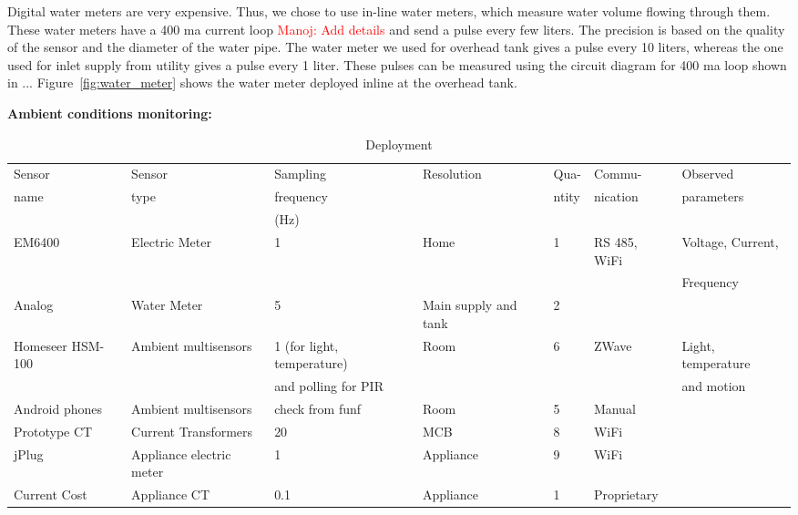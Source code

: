 \documentclass[10pt]{sensys-proc}
\newcommand{\redcolor}[1]{\textcolor{red}{#1}}
\newcommand{\figref}[1]{Figure~\ref{#1}}
\begin{document}
\noindent Digital water meters are very expensive. Thus, we chose to use in-line water meters, which measure water volume flowing through them. These water meters have a 400 ma current loop \redcolor{Manoj: Add details} and send a pulse every few liters. The precision is based on the quality of the sensor and the diameter of the water pipe. The water meter we used for overhead tank gives a pulse every 10 liters, whereas the one used for inlet supply from utility gives a pulse every 1 liter. These pulses can be measured using the circuit diagram for 400 ma loop shown in ... \figref{fig:water_meter} shows the water meter deployed inline at the overhead tank.

\noindent \textbf{Ambient conditions monitoring:} 




\begin{table}
\caption{Deployment}

\label{tab:sensing}
\tabcolsep=0.015cm
\begin{tabular}{|l|l|l|l|l|l|l|}
\hline
Sensor&Sensor&Sampling&Resolution&Qua-&Commu-&Observed\\
name&type&frequency&&ntity&nication&parameters\\
&&(Hz)&&&&\\
\hline

EM6400&Electric Meter&1&Home&1&RS 485, WiFi&Voltage, Current,\\ 
&&&&&&Frequency\\ \hline
Analog&Water Meter&5&Main supply and tank&2&\\ \hline
Homeseer HSM-100&Ambient multisensors&1 (for light, temperature)&Room &6&ZWave&Light, temperature\\ 
                &&and polling for PIR&&&& and motion\\ \hline
Android phones&Ambient multisensors& check from funf&Room&5&Manual\\ \hline
Prototype CT&Current Transformers&20&MCB&8&WiFi\\ \hline
jPlug&Appliance electric meter & 1 &Appliance&9&WiFi\\ \hline
Current Cost&Appliance CT&0.1&Appliance&1&Proprietary\\ \hline
\hline

\end{tabular}


\end{table}
\end{document}
